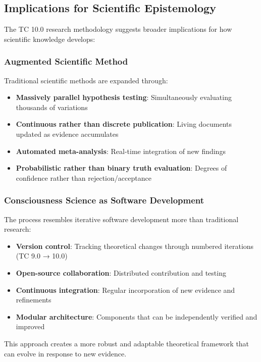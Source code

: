 \documentclass[12pt]{article}
\begin{document}
\subsection{Implications for Scientific Epistemology}

The TC 10.0 research methodology suggests broader implications for how scientific knowledge develops:

\subsubsection{Augmented Scientific Method}

Traditional scientific methods are expanded through:

\begin{itemize}
    \item \textbf{Massively parallel hypothesis testing}: Simultaneously evaluating thousands of variations
    \item \textbf{Continuous rather than discrete publication}: Living documents updated as evidence accumulates
    \item \textbf{Automated meta-analysis}: Real-time integration of new findings
    \item \textbf{Probabilistic rather than binary truth evaluation}: Degrees of confidence rather than rejection/acceptance
\end{itemize}

\subsubsection{Consciousness Science as Software Development}

The process resembles iterative software development more than traditional research:

\begin{itemize}
    \item \textbf{Version control}: Tracking theoretical changes through numbered iterations (TC 9.0 → 10.0)
    \item \textbf{Open-source collaboration}: Distributed contribution and testing
    \item \textbf{Continuous integration}: Regular incorporation of new evidence and refinements
    \item \textbf{Modular architecture}: Components that can be independently verified and improved
\end{itemize}

This approach creates a more robust and adaptable theoretical framework that can evolve in response to new evidence.
\end{document}
